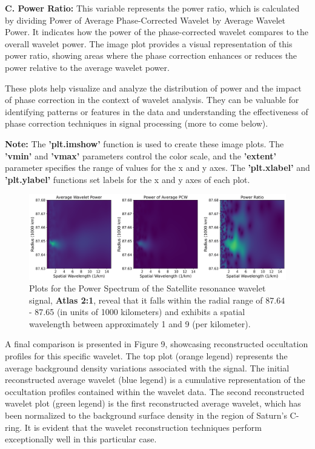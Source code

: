 \documentclass{article}
\begin{document}
\textbf{C. Power Ratio:}
This variable represents the power ratio, which is calculated by dividing Power of Average Phase-Corrected Wavelet by Average Wavelet Power. It indicates how the power of the phase-corrected wavelet compares to the overall wavelet power. The image plot provides a visual representation of this power ratio, showing areas where the phase correction enhances or reduces the power relative to the average wavelet power.

These plots help visualize and analyze the distribution of power and the impact of phase correction in the context of wavelet analysis. They can be valuable for identifying patterns or features in the data and understanding the effectiveness of phase correction techniques in signal processing (more to come below).

\vspace{0.5pt}

\textbf{Note:}
The \textbf{'plt.imshow'} function is used to create these image plots. The \textbf{'vmin'} and \textbf{'vmax'} parameters control the color scale, and the \textbf{'extent'} parameter specifies the range of values for the x and y axes. The \textbf{'plt.xlabel'} and \textbf{'plt.ylabel'} functions set labels for the x and y axes of each plot.

\begin{figure}[h]
\centering 
\includegraphics[width=1.0\textwidth]{power_ratio_plotw87.png} 
\caption{Plots for the Power Spectrum of the Satellite resonance wavelet signal, \textbf{Atlas 2:1}, reveal that it falls within the radial range of 87.64 - 87.65 (in units of 1000 kilometers) and exhibits a spatial wavelength between approximately 1 and 9 (per kilometer).} \label{fig:my_label}
\end{figure}


A final comparison is presented in Figure 9, showcasing reconstructed occultation profiles for this specific wavelet. The top plot (orange legend) represents the average background density variations associated with the signal. The initial reconstructed average wavelet (blue legend) is a cumulative representation of the occultation profiles contained within the wavelet data. The second reconstructed wavelet plot (green legend) is the first reconstructed average wavelet, which has been normalized to the background surface density in the region of Saturn's C-ring. It is evident that the wavelet reconstruction techniques perform exceptionally well in this particular case.
\end{document}
